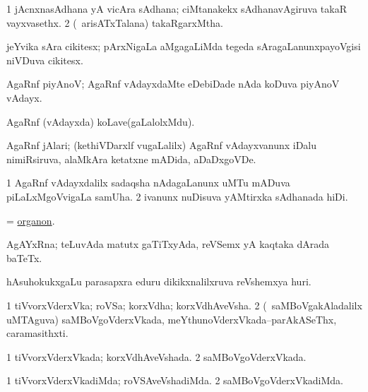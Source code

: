 \bentry
{}
\gl{\nA}
\bmng
\bnum
\num{1} jAcnxnasAdhana yA vicAra sAdhana; ciMtanakekx sAdhanavAgiruva takaR vayxvasethx. 
\num{2} (\kanmu\ arisATxTalana) takaRgarxMtha. 
\enum
\emng
\eentry


\bentry
{}
\gl{\nA}
\bmng
jeYvika sAra cikitesx; pArxNigaLa aMgagaLiMda tegeda sAragaLanunxpayoVgisi niVDuva cikitesx. 
\emng
\eentry

\bentry
{}
\gl{\nA}
\bmng
AgaRnf piyAnoV; AgaRnf vAdayxdaMte eDebiDade nAda koDuva piyAnoV vAdayx. 
\emng
\eentry

\bentry
{}
\gl{\nA}
\bmng
AgaRnf (vAdayxda) koLave(gaLalolxMdu). 
\emng
\eentry

\bentry
{}
\gl{\nA}
\bmng
AgaRnf jAlari; (kethiVDarxlf \mo vugaLalilx) AgaRnf vAdayxvanunx iDalu nimiRsiruva, alaMkAra ketatxne mADida, aDaDxgoVDe. 
\emng
\eentry

\bentry
{}
\gl{\nA}
\bmng
\bnum
\num{1} AgaRnf vAdayxdalilx sadaqsha nAdagaLanunx uMTu mADuva piLaLxMgoVvigaLa samUha. 
\num{2} ivanunx nuDisuva yAMtirxka sAdhanada hiDi. 
\enum
\emng
\eentry

\bentry
{}
\gl{\nA}
\bmng
= \hyperlink{organon}{organon}. 
\emng
\eentry


\bentry
{}
\gl{\nA}
\bmng
AgAYxRna; teLuvAda matutx gaTiTxyAda, reVSemx yA kaqtaka dArada baTeTx. 
\emng
\eentry

\bentry
{}
\gl{\nA}
\bmng
hAsuhokukxgaLu parasapxra eduru dikikxnalilxruva reVshemxya huri. 
\emng
\eentry

\bentry
{}
\gl{\nA}
\bmng
\bnum
\num{1} tiVvorxVderxVka; roVSa; korxVdha; korxVdhAveVsha. 
\num{2} (\kanmu\ saMBoVgakAladalilx uMTAguva) saMBoVgoVderxVkada, meYthunoVderxVkada--parAkASeThx, caramasithxti. 
\enum
\emng
\eentry

\bentry
{}
\gl{\gu}
\bmng
\bnum
\num{1} tiVvorxVderxVkada; korxVdhAveVshada. 
\num{2} saMBoVgoVderxVkada. 
\enum
\emng
\eentry

\bentry
{}
\gl{\kirxvi}
\bmng
\bnum
\num{1} tiVvorxVderxVkadiMda; roVSAveVshadiMda. 
\num{2} saMBoVgoVderxVkadiMda. 
\enum
\emng
\eentry


